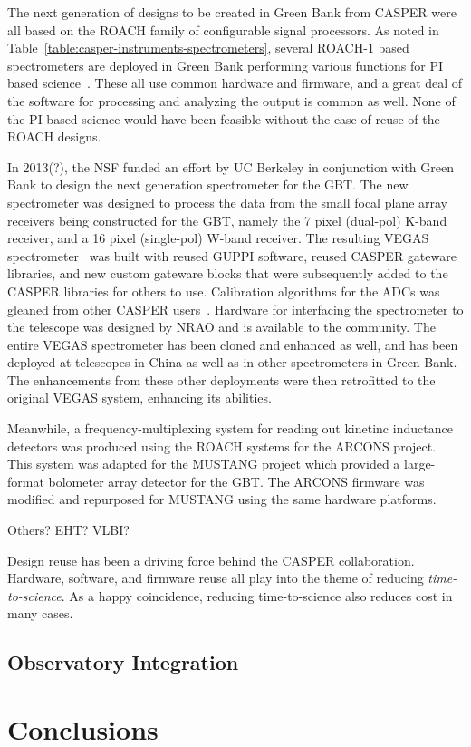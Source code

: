 \documentclass{ws-jai}
\begin{document}
The next generation of designs to be created in Green Bank from CASPER
were all based on the ROACH family of configurable signal processors.
As noted in Table~\ref{table:casper-instruments-spectrometers}, several ROACH-1 based spectrometers
are deployed in Green Bank performing various functions for PI based
science~\cite{gbtrans, skynet}.  These all use common
hardware and firmware, and a great deal of the software for processing
and analyzing the output is common as well.  None of the PI based
science would have been feasible without the ease of reuse of the
ROACH designs.

In 2013(?), the NSF funded an effort by UC Berkeley in conjunction
with Green Bank to design the next generation spectrometer for the
GBT.  The new spectrometer was designed to process the data from the
small focal plane array receivers being constructed for the GBT, namely
the 7 pixel (dual-pol) K-band receiver, and a 16 pixel (single-pol)
W-band receiver.  The resulting VEGAS
spectrometer~\cite{chennamangalam2014gpu} was built with reused GUPPI
software, reused CASPER gateware libraries, and new custom gateware
blocks that were subsequently added to the CASPER libraries for others
to use.  Calibration algorithms for the ADCs was gleaned from other
CASPER users~\cite{Jack and Rurik}.  Hardware for interfacing the
spectrometer to the telescope was designed by NRAO and is available to
the community.  The entire VEGAS spectrometer has been cloned and
enhanced as well, and has been deployed at telescopes in China as well
as in other spectrometers in Green Bank.  The enhancements from these
other deployments were then retrofitted to the original VEGAS system,
enhancing its abilities.

Meanwhile, a frequency-multiplexing system for reading out kinetinc
inductance detectors was produced using the ROACH systems for the
ARCONS project.  This system was adapted for the MUSTANG project which
provided a large-format bolometer array detector for the GBT.  The
ARCONS firmware was modified and repurposed for MUSTANG using the same
hardware platforms. 

Others?  EHT? VLBI?

Design reuse has been a driving force behind the CASPER collaboration.
Hardware, software, and firmware reuse all play into the theme of
reducing \emph{time-to-science}.  As a happy coincidence, reducing
time-to-science also reduces cost in many cases.


\subsection{Observatory Integration}


\section{Conclusions} \label{sec:Conclusions}





\end{document}
